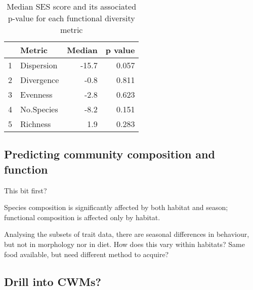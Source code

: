 \documentclass[12pt,a4paper]{article}\usepackage[]{graphicx}\usepackage[]{color}
\begin{document}
\begin{table}[ht]
\centering
\caption{Median SES score and its associated p-value for each functional diversity metric} 
\label{SESrestab}
\begin{tabular}{rlrr}
  \hline
 & Metric & Median & p value \\ 
  \hline
1 & Dispersion & -15.7 & 0.057 \\ 
  2 & Divergence & -0.8 & 0.811 \\ 
  3 & Evenness & -2.8 & 0.623 \\ 
  4 & No.Species & -8.2 & 0.151 \\ 
  5 & Richness & 1.9 & 0.283 \\ 
   \hline
\end{tabular}
\end{table}


\clearpage
\subsection{Predicting community composition and function}

This bit first?

Species composition is significantly affected by both habitat and season; functional composition is affected only by habitat.

Analysing the subsets of trait data, there are seasonal differences in behaviour, but not in morphology nor in diet. How does this vary within habitats? Same food available, but need different method to acquire?

\clearpage
\subsection{Drill into CWMs?}
\end{document}
